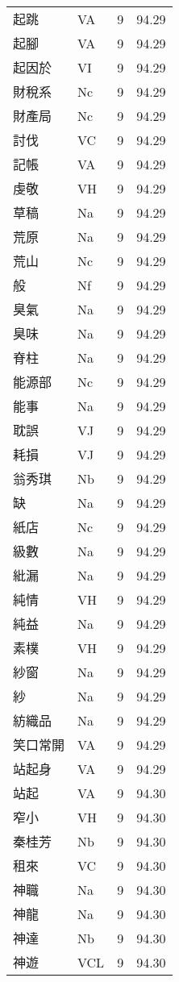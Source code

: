 \documentclass[twocolumn]{book}
\begin{document}
\begin{supertabular}{llrr}
起跳 & VA & 9 &  94.29\\
起腳 & VA & 9 &  94.29\\
起因於 & VI & 9 &  94.29\\
財稅系 & Nc & 9 &  94.29\\
財產局 & Nc & 9 &  94.29\\
討伐 & VC & 9 &  94.29\\
記帳 & VA & 9 &  94.29\\
虔敬 & VH & 9 &  94.29\\
草稿 & Na & 9 &  94.29\\
荒原 & Na & 9 &  94.29\\
荒山 & Nc & 9 &  94.29\\
般 & Nf & 9 &  94.29\\
臭氣 & Na & 9 &  94.29\\
臭味 & Na & 9 &  94.29\\
脊柱 & Na & 9 &  94.29\\
能源部 & Nc & 9 &  94.29\\
能事 & Na & 9 &  94.29\\
耽誤 & VJ & 9 &  94.29\\
耗損 & VJ & 9 &  94.29\\
翁秀琪 & Nb & 9 &  94.29\\
缺 & Na & 9 &  94.29\\
紙店 & Nc & 9 &  94.29\\
級數 & Na & 9 &  94.29\\
紕漏 & Na & 9 &  94.29\\
純情 & VH & 9 &  94.29\\
純益 & Na & 9 &  94.29\\
素樸 & VH & 9 &  94.29\\
紗窗 & Na & 9 &  94.29\\
紗 & Na & 9 &  94.29\\
紡織品 & Na & 9 &  94.29\\
笑口常開 & VA & 9 &  94.29\\
站起身 & VA & 9 &  94.29\\
站起 & VA & 9 &  94.30\\
窄小 & VH & 9 &  94.30\\
秦桂芳 & Nb & 9 &  94.30\\
租來 & VC & 9 &  94.30\\
神職 & Na & 9 &  94.30\\
神龍 & Na & 9 &  94.30\\
神達 & Nb & 9 &  94.30\\
神遊 & VCL & 9 &  94.30\\

\end{supertabular}
\end{document}
